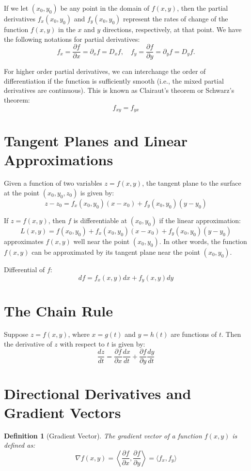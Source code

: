 \documentclass{book}
\newtheorem{definition}{Definition}[chapter]
\theoremstyle{remark}
\begin{document}
If we let $(x_0, y_0)$ be any point in the domain of $f(x, y)$, then the partial derivatives $f_x(x_0, y_0)$ and $f_y(x_0, y_0)$ represent the rates of change of the function $f(x, y)$ in the $x$ and $y$ directions, respectively, at that point. We have the following notations for partial derivatives:
\[
    f_x = \dfrac{\partial f}{\partial x} = \partial_x f = D_x f, \quad f_y = \dfrac{\partial f}{\partial y} = \partial_y f = D_y f.
\]

For higher order partial derivatives, we can interchange the order of differentiation if the function is sufficiently smooth (i.e., the mixed partial derivatives are continuous). This is known as Clairaut's theorem or Schwarz's theorem:
\[
    f_{xy} = f_{yx}
\]

\section{Tangent Planes and Linear Approximations}

Given a function of two variables $z = f(x, y)$, the tangent plane to the surface at the point $(x_0, y_0, z_0)$ is given by:
\[
    z - z_0 = f_x(x_0, y_0)(x - x_0) + f_y(x_0, y_0)(y - y_0)
\]

If $z = f(x, y)$, then $f$ is differentiable at $(x_0, y_0)$ if the linear approximation:
\[
    L(x, y) = f(x_0, y_0) + f_x(x_0, y_0)(x - x_0) + f_y(x_0, y_0)(y - y_0)
\]
approximates $f(x, y)$ well near the point $(x_0, y_0)$. In other words, the function $f(x, y)$ can be approximated by its tangent plane near the point $(x_0, y_0)$.

Differential of $f$:
\[
    df = f_x(x, y) dx + f_y(x, y) dy
\]

\section{The Chain Rule}

Suppose $z = f(x, y)$, where $x = g(t)$ and $y = h(t)$ are functions of $t$. Then the derivative of $z$ with respect to $t$ is given by:
\[
    \frac{dz}{dt} = \frac{\partial f}{\partial x} \frac{dx}{dt} + \frac{\partial f}{\partial y} \frac{dy}{dt}
\]

\section{Directional Derivatives and Gradient Vectors}

\begin{definition}[Gradient Vector]
    The gradient vector of a function $f(x, y)$ is defined as:
    \[
        \nabla f(x, y) = \left\langle \frac{\partial f}{\partial x}, \frac{\partial f}{\partial y} \right\rangle = \langle f_x, f_y \rangle
    \]
\end{definition}
\end{document}
